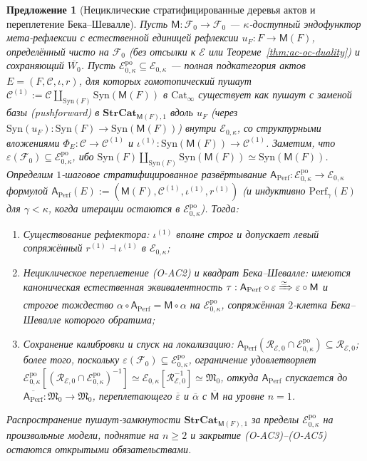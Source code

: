 \documentclass[11pt]{article}
\theoremstyle{plain}
\newtheorem{proposition}[theorem]{Предложение}
\theoremstyle{definition}
\newcommand{\cF}{\mathcal{F}}
\newcommand{\cC}{\mathcal{C}}
\newcommand{\fM}{\mathfrak{M}}
\newcommand{\Cat}{\mathrm{Cat}}
\newcommand{\Syn}{\mathrm{Syn}}
\newcommand{\cE}{\mathcal{E}}
\begin{document}
\begin{proposition}[Нециклические стратифицированные деревья актов и переплетение Бека--Шевалле]\label{prop:perf-noncyclic-bc}
Пусть $\mathsf{M} : \cF_0 \to \cF_0$ — $\kappa$-доступный эндофунктор мета-рефлексии с естественной единицей рефлексии $u_F : F \to \mathsf{M}(F)$, определённый чисто на $\cF_0$ (без отсылки к $\cE$ или Теореме~\ref{thm:ac-oc-duality}) и сохраняющий $\overline{W_0}$. Пусть $\cE_{0,\kappa}^{\mathrm{po}} \subseteq \cE_{0,\kappa}$ — полная подкатегория актов $E = (F, \cC, \iota, r)$, для которых гомотопический пушаут $\cC^{(1)} := \cC \amalg_{\Syn(F)} \Syn(\mathsf{M}(F))$ в $\Cat_\infty$ существует как пушаут с заменой базы (pushforward) в $\mathbf{StrCat}_{\mathsf{M}(F), 1}$ вдоль $u_F$ (через $\Syn(u_F) : \Syn(F) \to \Syn(\mathsf{M}(F))$) внутри $\cE_{0, \kappa}$, со структурными вложениями $\Phi_E : \cC \to \cC^{(1)}$ и $\iota^{(1)} : \Syn(\mathsf{M}(F)) \to \cC^{(1)}$. Заметим, что $\varepsilon(\cF_0) \subseteq \cE_{0,\kappa}^{\mathrm{po}}$, ибо $\Syn(F) \amalg_{\Syn(F)} \Syn(\mathsf{M}(F)) \simeq \Syn(\mathsf{M}(F))$. Определим $1$-шаговое стратифицированное развёртывание $\mathsf{A}_{\mathrm{Perf}} : \cE_{0,\kappa}^{\mathrm{po}} \to \cE_{0,\kappa}$ формулой $\mathsf{A}_{\mathrm{Perf}}(E) := (\mathsf{M}(F), \cC^{(1)}, \iota^{(1)}, r^{(1)})$ (и индуктивно $\mathrm{Perf}_\gamma(E)$ для $\gamma < \kappa$, когда итерации остаются в $\cE_{0,\kappa}^{\mathrm{po}}$). Тогда:
\begin{enumerate}[nosep,label=(\roman*)]
\item \emph{Существование рефлектора}: $\iota^{(1)}$ вполне строг и допускает левый сопряжённый $r^{(1)} \dashv \iota^{(1)}$ в $\cE_{0,\kappa}$;
\item \emph{Нециклическое переплетение \textup{(O-AC2)} и квадрат Бека--Шевалле}: имеются каноническая естественная эквивалентность $\tau : \mathsf{A}_{\mathrm{Perf}} \circ \varepsilon \xRightarrow{\simeq} \varepsilon \circ \mathsf{M}$ и строгое тождество $\alpha \circ \mathsf{A}_{\mathrm{Perf}} = \mathsf{M} \circ \alpha$ на $\cE_{0,\kappa}^{\mathrm{po}}$, сопряжённая $2$-клетка Бека--Шевалле которого обратима;
\item \emph{Сохранение калибровки и спуск на локализацию}: $\mathsf{A}_{\mathrm{Perf}}(\mathcal{R}_{\cE, 0} \cap \cE_{0,\kappa}^{\mathrm{po}}) \subseteq \mathcal{R}_{\cE, 0}$; более того, поскольку $\varepsilon(\cF_0) \subseteq \cE_{0,\kappa}^{\mathrm{po}}$, ограничение удовлетворяет $\cE_{0,\kappa}^{\mathrm{po}}[(\mathcal{R}_{\cE,0} \cap \cE_{0,\kappa}^{\mathrm{po}})^{-1}] \simeq \cE_{0,\kappa}[\mathcal{R}_{\cE,0}^{-1}] \simeq \fM_0$, откуда $\mathsf{A}_{\mathrm{Perf}}$ спускается до $\overline{\mathsf{A}_{\mathrm{Perf}}} : \fM_0 \to \fM_0$, переплетающего $\overline{\varepsilon}$ и $\overline{\alpha}$ с $\overline{\mathsf{M}}$ на уровне $n = 1$.
\end{enumerate}
Распространение пушаут-замкнутости $\mathbf{StrCat}_{\mathsf{M}(F), 1}$ за пределы $\cE_{0,\kappa}^{\mathrm{po}}$ на произвольные модели, поднятие на $n \ge 2$ и закрытие \textup{(O-AC3)--(O-AC5)} остаются открытыми обязательствами.
\end{proposition}
\end{document}
